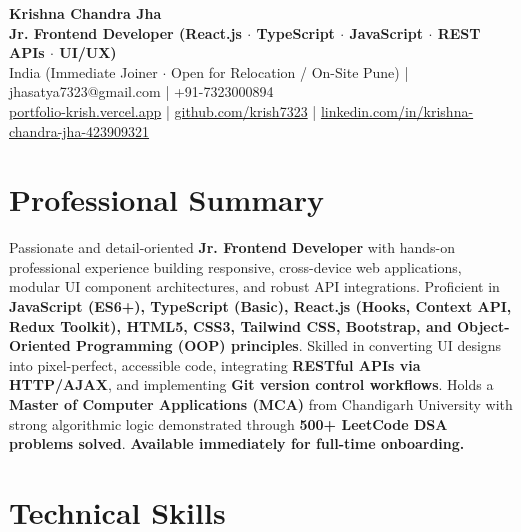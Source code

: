 \documentclass[a4paper,10pt]{article}
\begin{document}
\begin{center}

    {\LARGE \textbf{Krishna Chandra Jha}} \\[2.5pt]

    \textbf{Jr. Frontend Developer (React.js $\cdot$ TypeScript $\cdot$ JavaScript $\cdot$ REST APIs $\cdot$ UI/UX)} \\[3.5pt]

    India (Immediate Joiner $\cdot$ Open for Relocation / On-Site Pune)
    \quad | \quad
    jhasatya7323@gmail.com
    \quad | \quad
    +91-7323000894
    \\[2.5pt]

    \href{https://portfolio-ashen-alpha-dv0whhsamo.vercel.app/}{portfolio-krish.vercel.app}
    \quad | \quad
    \href{https://github.com/krish7323}{github.com/krish7323}
    \quad | \quad
    \href{https://linkedin.com/in/krishna-chandra-jha-423909321}
    {linkedin.com/in/krishna-chandra-jha-423909321}

\end{center}

\section*{Professional Summary}

Passionate and detail-oriented \textbf{Jr. Frontend Developer} with hands-on professional experience building responsive, cross-device web applications, modular UI component architectures, and robust API integrations. Proficient in \textbf{JavaScript (ES6+), TypeScript (Basic), React.js (Hooks, Context API, Redux Toolkit), HTML5, CSS3, Tailwind CSS, Bootstrap, and Object-Oriented Programming (OOP) principles}. Skilled in converting UI designs into pixel-perfect, accessible code, integrating \textbf{RESTful APIs via HTTP/AJAX}, and implementing \textbf{Git version control workflows}. Holds a \textbf{Master of Computer Applications (MCA)} from Chandigarh University with strong algorithmic logic demonstrated through \textbf{500+ LeetCode DSA problems solved}. \textbf{Available immediately for full-time onboarding.}

\section*{Technical Skills}
\end{document}
